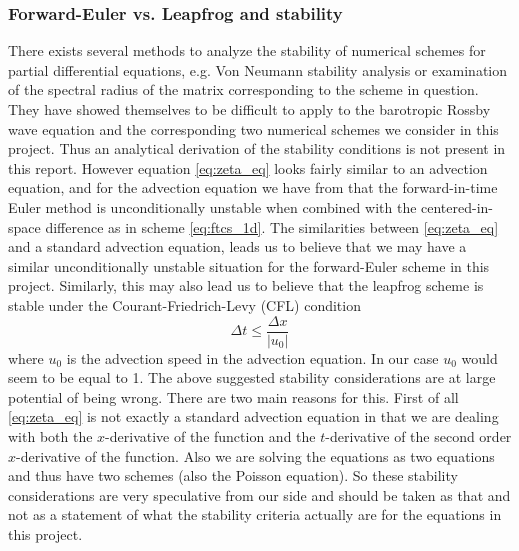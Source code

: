 \documentclass[12pt]{article}
\numberwithin{figure}{section}
\numberwithin{table}{section}
\begin{document}
\subsubsection{Forward-Euler vs. Leapfrog and stability} \label{sec:stability}
There exists several methods to analyze the stability of numerical schemes for partial differential equations, e.g. Von Neumann stability analysis or examination of the spectral radius of the matrix corresponding to the scheme in question. They have showed themselves to be difficult to apply to the barotropic Rossby wave equation and the corresponding two numerical schemes we consider in this project. Thus an analytical derivation of the stability conditions is not present in this report. However equation \eqref{eq:zeta_eq} looks fairly similar to an advection equation, and for the advection equation we have from \cite{lars_petter} that the forward-in-time Euler method is unconditionally unstable when combined with the centered-in-space difference as in scheme \eqref{eq:ftcs_1d}. The similarities between \eqref{eq:zeta_eq} and a standard advection equation, leads us to believe that we may have a similar unconditionally unstable situation for the forward-Euler scheme in this project. Similarly, this may also lead us to believe that the leapfrog scheme is stable under the Courant-Friedrich-Levy (CFL) condition \cite{lars_petter}
\begin{equation*}
	\Delta t\leq\frac{\Delta x}{|u_0|}
    \label{eq:stability_crit}
\end{equation*}
where $u_0$ is the advection speed in the advection equation. In our case $u_0$ would seem to be equal to 1. The above suggested stability considerations are at large potential of being wrong. There are two main reasons for this. First of all \eqref{eq:zeta_eq} is not exactly a standard advection equation in that we are dealing with both the $x$-derivative of the function and the $t$-derivative of the second order $x$-derivative of the function. Also we are solving the equations as two equations and thus have two schemes (also the Poisson equation). So these stability considerations are very speculative from our side and should be taken as that and not as a statement of what the stability criteria actually are for the equations in this project. \\
\end{document}
